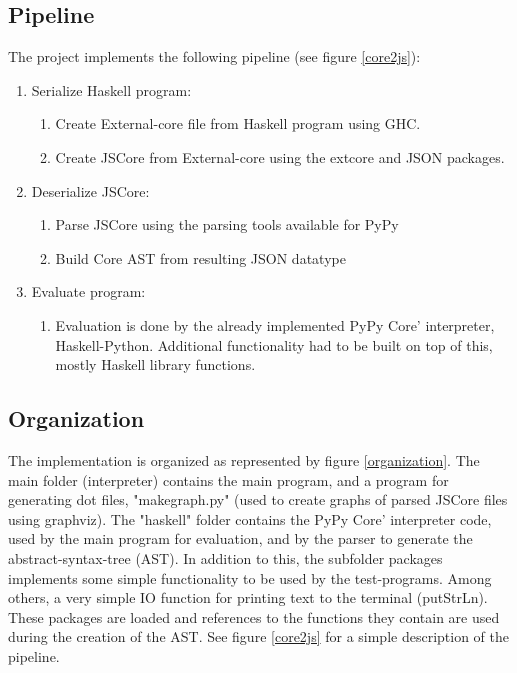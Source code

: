 \subsection{Pipeline}

The project implements the following pipeline (see figure \ref{core2js}):
\begin{enumerate}
\item Serialize Haskell program: 
  \begin{enumerate}
  \item Create External-core file from Haskell program using GHC.
  \item Create JSCore from External-core using the extcore and JSON packages.
  \end{enumerate}
\item Deserialize JSCore:
  \begin{enumerate}
  \item Parse JSCore using the parsing tools available for PyPy
  \item Build Core AST from resulting JSON datatype
  \end{enumerate}
\item Evaluate program:
  \begin{enumerate}
  \item Evaluation is done by the already implemented PyPy Core' interpreter,
  Haskell-Python. Additional functionality had to be built on top of this, mostly 
  Haskell library functions.
  \end {enumerate}
\end{enumerate}

\subsection{Organization}

The implementation is organized as represented by figure \ref{organization}. The
main folder (interpreter) contains the main program, and a program for generating
dot files, "makegraph.py" (used to create graphs of parsed JSCore files using graphviz). 
The "haskell" folder
contains the PyPy Core' interpreter code, used by the main program for evaluation, 
and by the parser to generate the abstract-syntax-tree (AST). In addition to this,
the subfolder packages implements some simple functionality to be used by the test-programs.
Among others, a very simple IO function for printing text to the terminal (putStrLn).
These packages are loaded and references to the functions they contain are used during
the creation of the AST. See figure \ref{core2js} for a simple description of the pipeline.

